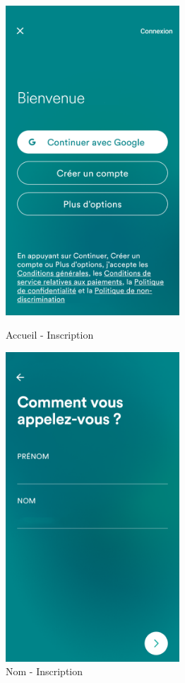 \begin{figure}[h]
    \begin{minipage}[c]{.46\linewidth}
        \centering
        \includegraphics[width=6.5cm]{images/screen/mobile/1.png}
        \caption{Accueil - Inscription}
    \end{minipage}
    \hfill%
    \begin{minipage}[c]{.46\linewidth}
        \centering
        \includegraphics[width=6.5cm]{images/screen/mobile/2.png}
        \caption{Nom - Inscription}
    \end{minipage}
\end{figure}
